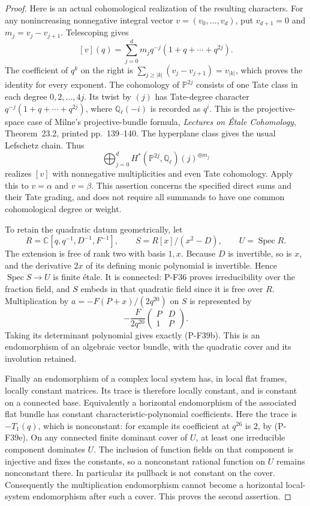 \begin{proof}
Here is an actual cohomological realization of the resulting
characters. For any nonincreasing nonnegative integral vector
$v=(v_0,\ldots,v_d)$, put $v_{d+1}=0$ and
$m_j=v_j-v_{j+1}$. Telescoping gives
\[
 [v](q)=\sum_{j=0}^d m_j q^{-j}(1+q+\cdots+q^{2j}).
 \tag{P-F39h}
\]
The coefficient of $q^k$ on the right is
$\sum_{j\ge|k|}(v_j-v_{j+1})=v_{|k|}$, which proves
the identity for every exponent. The cohomology of
$\mathbb P^{2j}$ consists of one Tate class in each degree
$0,2,\ldots,4j$. Its twist by $(j)$ has Tate-degree
character $q^{-j}(1+q+\cdots+q^{2j})$, where
$\mathbb Q_\ell(-i)$ is recorded as $q^i$.
This is the projective-space case of Milne's projective-bundle
formula, \emph{Lectures on \'{E}tale Cohomology}, Theorem~23.2,
printed pp.~139--140. The hyperplane class gives the usual
Lefschetz chain. Thus
\[
       \bigoplus_{j=0}^d
       H^*(\mathbb P^{2j},\mathbb Q_\ell)(j)^{\oplus m_j}
 \tag{P-F39i}
\]
realizes $[v]$ with nonnegative multiplicities and even Tate
cohomology. Apply this to $v=\alpha$ and $v=\beta$.
This assertion concerns the specified direct sums and their
Tate grading, and does not require all summands to have one
common cohomological degree or weight.

To retain the quadratic datum geometrically, let
\[
 R=\mathbb C[q,q^{-1},D^{-1},F^{-1}],\qquad
 S=R[x]/(x^2-D),\qquad U=\operatorname{Spec}R.
\]
The extension is free of rank two with basis $1,x$.
Because $D$ is invertible, so is $x$, and the derivative
$2x$ of its defining monic polynomial is invertible.
Hence $\operatorname{Spec}S\to U$ is finite \'{e}tale.
It is connected: P-F36 proves irreducibility over the
fraction field, and $S$ embeds in that quadratic field
since it is free over $R$.
Multiplication by $a=-F(P+x)/(2q^{20})$ on $S$ is represented by
\[
 -\frac{F}{2q^{20}}
   \begin{pmatrix}P&D\\1&P\end{pmatrix}.
 \tag{P-F39j}
\]
Taking its determinant polynomial gives exactly (P-F39b).
This is an endomorphism of an algebraic vector bundle,
with the quadratic cover and its involution retained.

Finally an endomorphism of a complex local system has,
in local flat frames, locally constant matrices. Its trace
is therefore locally constant, and is constant on a connected
base. Equivalently a horizontal endomorphism of the associated
flat bundle has constant characteristic-polynomial coefficients.
Here the trace is $-T_1(q)$, which is nonconstant: for example
its coefficient at $q^{26}$ is $2$, by (P-F39e).
On any connected finite dominant cover of $U$, at least one
irreducible component dominates $U$. The inclusion of function
fields on that component is injective and fixes the constants,
so a nonconstant rational function on $U$ remains nonconstant
there. In particular its pullback is not constant on the cover.
Consequently the multiplication endomorphism cannot become
a horizontal local-system endomorphism after such a cover.
This proves the second assertion.
\end{proof}

